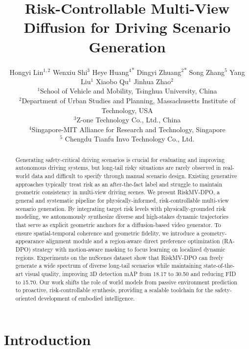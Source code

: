 \documentclass{article}
\title{Risk-Controllable Multi-View Diffusion for Driving Scenario Generation}
\author{
\begin{tabular}{c}
\footnotesize
Hongyi Lin$^{1,2}$\hspace{0.15em}
Wenxiu Shi$^{3}$\hspace{0.15em}
Heye Huang$^{4}$\textsuperscript{*}\hspace{0.15em}
Dingyi Zhuang$^{2}$\textsuperscript{*}\hspace{0.15em}
Song Zhang$^{5}$\hspace{0.15em}
Yang Liu$^{1}$\hspace{0.15em}
Xiaobo Qu$^{1}$\hspace{0.15em}
Jinhua Zhao$^{2}$\\[2pt]
\normalfont\mdseries\footnotesize
$^{1}$School of Vehicle and Mobility, Tsinghua University, China \\
\normalfont\mdseries\footnotesize$^{2}$Department of Urban Studies and Planning, Massachusetts Institute of Technology, USA \\
\normalfont\mdseries\footnotesize$^{3}$Z-one Technology Co., Ltd., China \\
\normalfont\mdseries\footnotesize$^{4}$Singapore-MIT Alliance for Research and Technology, Singapore\\
\normalfont\mdseries\footnotesize$^{5}$ Chengdu Tianfu Invo Technology Co., Ltd.
\end{tabular}
}
\date{}
\begin{document}
\maketitle

\begingroup
\renewcommand{\thefootnote}{}
\endgroup

\begin{abstract}
Generating safety-critical driving scenarios is crucial for evaluating and improving autonomous driving systems, but long-tail risky situations are rarely observed in real-world data and difficult to specify through manual scenario design. Existing generative approaches typically treat risk as an after-the-fact label and struggle to maintain geometric consistency in multi-view driving scenes. 
We present RiskMV-DPO, a general and systematic pipeline for physically-informed, risk-controllable multi-view scenario generation. By integrating target risk levels with physically-grounded risk modeling, we autonomously synthesize diverse and high-stakes dynamic trajectories that serve as explicit geometric anchors for a diffusion-based video generator. To ensure spatial-temporal coherence and geometric fidelity, we introduce a geometry-appearance alignment module and a region-aware direct preference optimization (RA-DPO) strategy with motion-aware masking to focus learning on localized dynamic regions.
Experiments on the nuScenes dataset show that RiskMV-DPO can freely generate a wide spectrum of diverse long-tail scenarios while maintaining state-of-the-art visual quality, improving 3D detection mAP from 18.17 to 30.50 and reducing FID to 15.70. Our work shifts the role of world models from passive environment prediction to proactive, risk-controllable synthesis, providing a scalable toolchain for the safety-oriented development of embodied intelligence. 
\end{abstract}


\section{Introduction}
\label{sec:intro}
\end{document}
